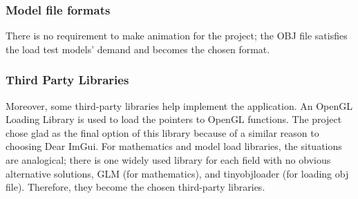 \subsubsection{Model file formats}
\label{br:cmf}

There is no requirement to make animation for the project; the OBJ file satisfies the load test models' demand and becomes the chosen format.

\subsubsection{Third Party Libraries}

Moreover, some third-party libraries help implement the application. An OpenGL Loading Library is used to load the pointers to OpenGL functions. The project chose glad \cite{glad} as the final option of this library because of a similar reason to choosing Dear ImGui. For mathematics and model load libraries, the situations are analogical; there is one widely used library for each field with no obvious alternative solutions, GLM \cite{glm} (for mathematics), and tinyobjloader \cite{objload} (for loading obj file). Therefore, they become the chosen third-party libraries.